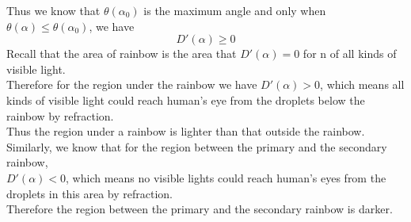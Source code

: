 \documentclass{article}
\begin{document}
\begin{spacing}{1.5}
Thus we know that $\theta(\alpha_0)$ is the maximum angle and only when $\theta(\alpha)\le\theta(\alpha_0)$, we have $$D'(\alpha)\geq 0$$
Recall that the area of rainbow is the area that $D'(\alpha)=0$ for n of all kinds of visible light.\\
Therefore for the region under the rainbow we have $D'(\alpha)>0$, which means all kinds of visible light could reach human's eye from the droplets below the rainbow by refraction.\\
Thus the region under a rainbow is lighter than that outside the rainbow.\\
Similarly, we know that for the region between the primary and the secondary rainbow, \\
$D'(\alpha)<0$, which means no visible lights could reach human's eyes from the droplets in this area by refraction.\\
Therefore the region between the primary and the secondary rainbow is darker.


\end{spacing}
\end{document}
